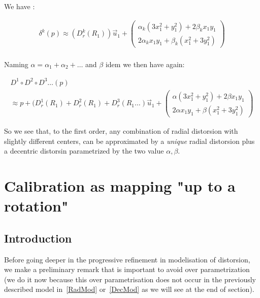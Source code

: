 We have :

\begin{equation}
\begin{multlined}
        \delta^k(p)  
	\approx  (D^k_r(R_1))  \vec{u}_1  
          +\begin{pmatrix} \alpha_k(3 x_1^2 + y_1^2 ) +2\beta_k x_1 y_1   \\ 2  \alpha_k x_1 y_1 +  \beta_k( x_1^2 + 3 y_1^2)  \end{pmatrix} \\
\end{multlined}
\end{equation}

Naming $\alpha =  \alpha_1+\alpha_2 + \dots$ and $\beta$ idem we then have again:


\begin{equation}
\begin{multlined}
	D^1 \circ D^2 \circ D^3 \dots (p)  \\
	\approx  p + (D^1_r(R_1) + D^2_r(R_1) +  D^3_r(R_1 \dots )  \vec{u}_1
	  +\begin{pmatrix} \alpha(3 x_1^2 + y_1^2 ) +2\beta x_1 y_1   \\ 2  \alpha x_1 y_1 +  \beta( x_1^2 + 3 y_1^2)  \end{pmatrix}
\end{multlined}
\end{equation}

So we see that, to the first order, any combination of radial distorsion with slightly different centers,
can be approximated by a \emph{unique} radial distorsion plus a decentric distorsin parametrized by the two value $\alpha,\beta$.





\section{Calibration as mapping "up to a rotation"}
\label{UpToARot}

\subsection{Introduction}

Before going deeper in the progressive refinement in modelisation of
distorsion, we  make a preliminary remark that is important
to avoid over parametrization (we do it now because this over parametrisation
does not occur in the previously described model in~\ref{RadMod} or~\ref{DecMod} 
as we will see at the end of section).


